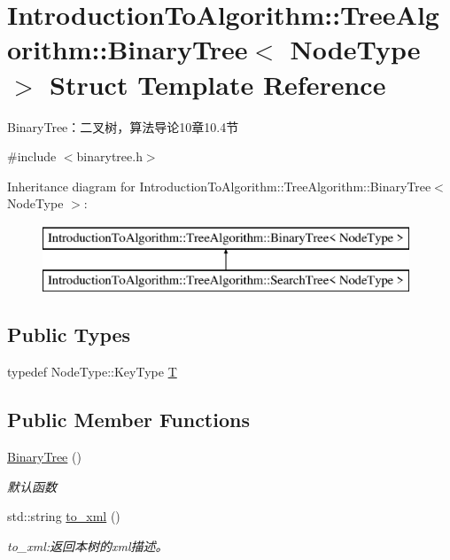 \hypertarget{struct_introduction_to_algorithm_1_1_tree_algorithm_1_1_binary_tree}{}\section{Introduction\+To\+Algorithm\+:\+:Tree\+Algorithm\+:\+:Binary\+Tree$<$ Node\+Type $>$ Struct Template Reference}
\label{struct_introduction_to_algorithm_1_1_tree_algorithm_1_1_binary_tree}


Binary\+Tree：二叉树，算法导论10章10.4节  




{\ttfamily \#include $<$binarytree.\+h$>$}

Inheritance diagram for Introduction\+To\+Algorithm\+:\+:Tree\+Algorithm\+:\+:Binary\+Tree$<$ Node\+Type $>$\+:\begin{figure}[H]
\begin{center}
\leavevmode
\includegraphics[height=2.000000cm]{struct_introduction_to_algorithm_1_1_tree_algorithm_1_1_binary_tree}
\end{center}
\end{figure}
\subsection*{Public Types}
\begin{DoxyCompactItemize}
\item 
typedef Node\+Type\+::\+Key\+Type \hyperlink{struct_introduction_to_algorithm_1_1_tree_algorithm_1_1_binary_tree_aca34063e8bc88ed0dde8c706c337c3d6}{T}
\end{DoxyCompactItemize}
\subsection*{Public Member Functions}
\begin{DoxyCompactItemize}
\item 
\hyperlink{struct_introduction_to_algorithm_1_1_tree_algorithm_1_1_binary_tree_a51032b5c1d2e07fd0b2f9e20c7358b5f}{Binary\+Tree} ()
\begin{DoxyCompactList}\small\item\em 默认函数 \end{DoxyCompactList}\item 
std\+::string \hyperlink{struct_introduction_to_algorithm_1_1_tree_algorithm_1_1_binary_tree_afbbda7b95bc09bfe063969b566127091}{to\+\_\+xml} ()
\begin{DoxyCompactList}\small\item\em to\+\_\+xml\+:返回本树的{\ttfamily xml}描述。 \end{DoxyCompactList}\end{DoxyCompactItemize}
